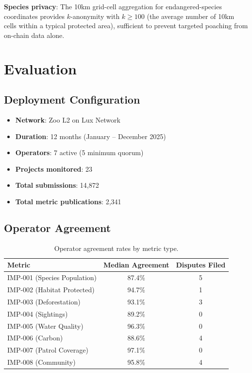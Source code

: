 \documentclass[11pt,letterpaper]{article}
\begin{document}
\textbf{Species privacy}: The 10km grid-cell aggregation for endangered-species coordinates provides $k$-anonymity with $k \geq 100$ (the average number of 10km cells within a typical protected area), sufficient to prevent targeted poaching from on-chain data alone.

\section{Evaluation}
\label{sec:evaluation}

\subsection{Deployment Configuration}

\begin{itemize}
    \item \textbf{Network}: Zoo L2 on Lux Network
    \item \textbf{Duration}: 12 months (January -- December 2025)
    \item \textbf{Operators}: 7 active (5 minimum quorum)
    \item \textbf{Projects monitored}: 23
    \item \textbf{Total submissions}: 14{,}872
    \item \textbf{Total metric publications}: 2{,}341
\end{itemize}

\subsection{Operator Agreement}

\begin{table}[t]
\centering
\begin{tabular}{lcc}
\toprule
\textbf{Metric} & \textbf{Median Agreement} & \textbf{Disputes Filed} \\
\midrule
IMP-001 (Species Population) & 87.4\% & 5 \\
IMP-002 (Habitat Protected) & 94.7\% & 1 \\
IMP-003 (Deforestation) & 93.1\% & 3 \\
IMP-004 (Sightings) & 89.2\% & 0 \\
IMP-005 (Water Quality) & 96.3\% & 0 \\
IMP-006 (Carbon) & 88.6\% & 4 \\
IMP-007 (Patrol Coverage) & 97.1\% & 0 \\
IMP-008 (Community) & 95.8\% & 4 \\
\bottomrule
\end{tabular}
\caption{Operator agreement rates by metric type.}
\label{tab:agreement}
\end{table}
\end{document}
